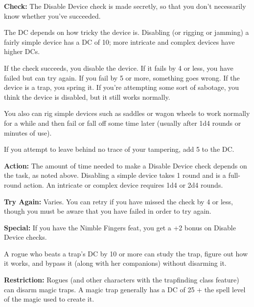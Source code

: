 \textbf{Check:} The Disable Device check is made secretly, so that you don't necessarily know whether you've succeeded.

The DC depends on how tricky the device is. Disabling (or rigging or jamming) a fairly simple device has a DC of 10; more intricate and complex devices have higher DCs.

If the check succeeds, you disable the device. If it fails by 4 or less, you have failed but can try again. If you fail by 5 or more, something goes wrong. If the device is a trap, you spring it. If you're attempting some sort of sabotage, you think the device is disabled, but it still works normally.

You also can rig simple devices such as saddles or wagon wheels to work normally for a while and then fail or fall off some time later (usually after 1d4 rounds or minutes of use).


If you attempt to leave behind no trace of your tampering, add 5 to the DC.

\textbf{Action:} The amount of time needed to make a Disable Device check depends on the task, as noted above. Disabling a simple device takes 1 round and is a full-round action. An intricate or complex device requires 1d4 or 2d4 rounds.

\textbf{Try Again:} Varies. You can retry if you have missed the check by 4 or less, though you must be aware that you have failed in order to try again.

\textbf{Special:} If you have the Nimble Fingers feat, you get a +2 bonus on Disable Device checks.

A rogue who beats a trap's DC by 10 or more can study the trap, figure out how it works, and bypass it (along with her companions) without disarming it.

\textbf{Restriction:} Rogues (and other characters with the trapfinding class feature) can disarm magic traps. A magic trap generally has a DC of 25 + the spell level of the magic used to create it.

